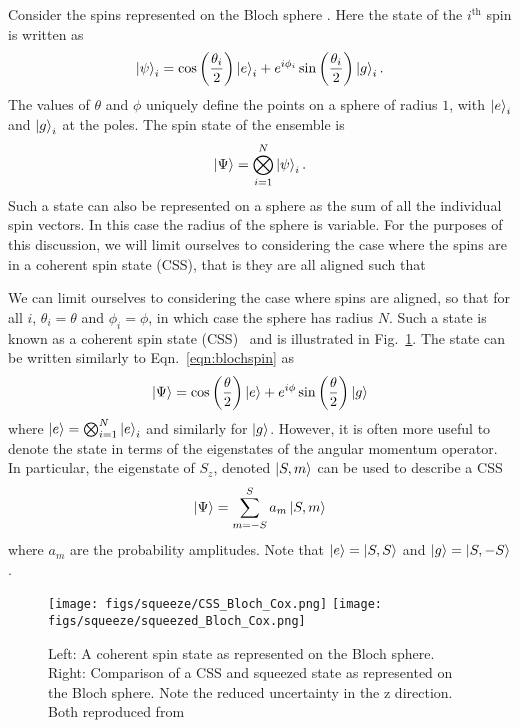 \documentclass{article}
\begin{document}
Consider the spins represented on the Bloch sphere \cite{PhysRevA.47.3554}.
Here the state of the $i^\text{th}$ spin is written as
%
\begin{equation}
  \ket{\psi}_i = \cos\left(\frac{\theta_i}{2}\right)\ket{e}_i +
  e^{i\phi_i}\sin\left(\frac{\theta_i}{2}\right)\ket{g}_i.
  \label{eqn:blochspin}
\end{equation}
%
The values of $\theta$ and $\phi$ uniquely define the points on a sphere of
radius $1$, with $\ket{e}_i$ and $\ket{g}_i$ at the poles. The spin state of
the ensemble is
%
\begin{equation}
  \ket{\Psi} = \bigotimes_{i=1}^N \ket{\psi}_i.
\end{equation}
Such a state can also be represented on a sphere as the sum of all the
individual spin vectors. In this case the radius of the sphere is variable. For
the purposes of this discussion, we will limit ourselves to considering the
case where the spins are in a coherent spin state (CSS), that is they are all
aligned such that 

We can limit ourselves to considering the case where spins are aligned,
so that for all $i$, $\theta_i = \theta$ and $\phi_i = \phi$, in which case the
sphere has radius $N$. Such a state is known as a coherent spin state
(CSS)~\cite{MA201189, Gazeau2009} and
is illustrated in Fig.~\ref{CSSbloch}. The state can be written similarly to
Eqn.~\ref{eqn:blochspin} as
%
\begin{equation}
  \ket{\Psi} = \cos\left(\frac{\theta}{2}\right)\ket{e} +
  e^{i\phi}\sin\left(\frac{\theta}{2}\right)\ket{g}
\end{equation}
%
where $\ket{e} = \bigotimes_{i=1}^N\ket{e}_i$ and similarly for $\ket{g}$.
However, it is often more useful to denote the state in terms of the
eigenstates of the angular momentum operator. In particular, the eigenstate of
$S_z$, denoted $\ket{S, m}$ can be used to describe a CSS
%
\begin{equation}
  \ket{\Psi} = \sum_{m=-S}^S a_m \ket{S, m}
\end{equation}
where $a_m$ are the probability amplitudes. Note that $\ket{e} = \ket{S, S}$
and $\ket{g} = \ket{S, -S}$.

\begin{figure}
  \centering
  \texttt{[image: figs/squeeze/CSS\_Bloch\_Cox.png]}
  \texttt{[image: figs/squeeze/squeezed\_Bloch\_Cox.png]}
  \caption{Left: A coherent spin state as represented on the Bloch sphere.
  Right: Comparison of a CSS and squeezed state as represented on the Bloch
  sphere. Note the reduced uncertainty in the z direction.
  Both reproduced from~\cite{Cox2016}}
  \label{CSSbloch}
\end{figure}
\end{document}
